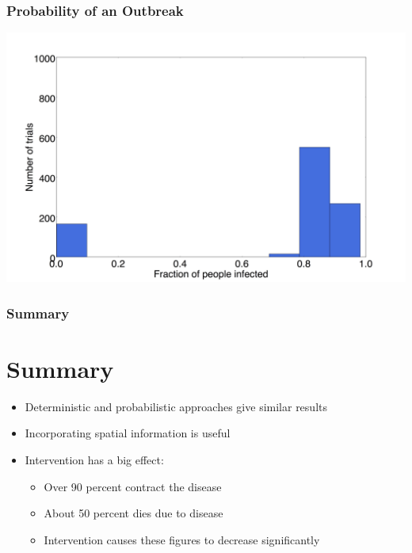 \documentclass[30pt]{beamer}
\begin{document}
\begin{frame}
\frametitle{Probability of an Outbreak}
\includegraphics[width=\textwidth]{Histogram-sabd}
\end{frame}


\begin{frame}
\frametitle{Summary}
\section{Summary}
\begin{itemize}
\item Deterministic and probabilistic approaches give similar results
\item Incorporating spatial information is useful
\item Intervention has a big effect:
\begin{itemize}
\item Over 90 percent contract the disease
\item About 50 percent dies due to disease
\item Intervention causes these figures to decrease significantly 
\end{itemize}
\end{itemize}
\end{frame}
\end{document}
